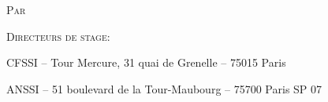 \begin{titlepage}
\begin{center}

  {\textsc{Par}}


  {\textbf{\large \auteur}}


  {\large \textsc{\organisme}}


  {\textsc{Directeurs de stage:}}


  {\large \directeurs}


\ifmentiondeprotection
	\mentiondeprotection
\else
	\vphantom{\mentiondeprotection}
\fi

  \hrulefill

  {\small CFSSI -- Tour Mercure, 31 quai de Grenelle -- 75015 Paris}

  {\small ANSSI -- 51 boulevard de la Tour-Maubourg -- 75700 Paris SP 07}




\end{center}
\vspace*{-2cm}
\end{titlepage}











